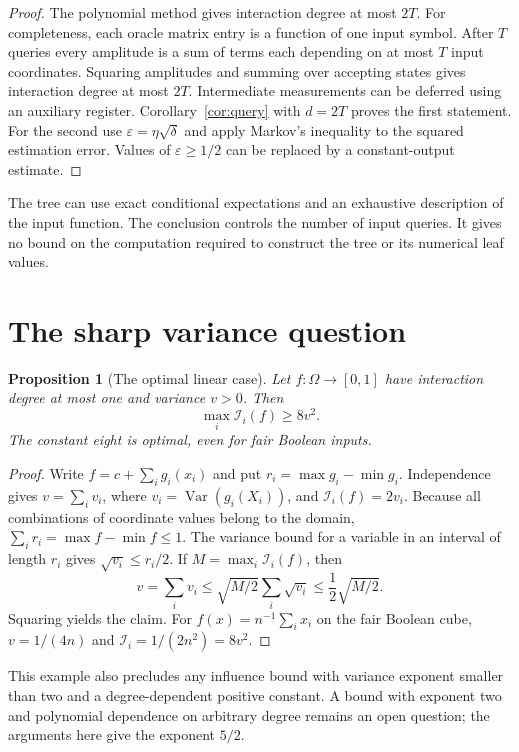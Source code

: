 \documentclass[11pt,reqno]{amsart}
\newtheorem{proposition}[theorem]{Proposition}
\theoremstyle{definition}
\theoremstyle{remark}
\newcommand{\Var}{\operatorname{Var}}
\newcommand{\cI}{\mathcal I}
\newcommand{\eps}{\varepsilon}
\numberwithin{equation}{section}
\begin{document}
\begin{proof}
The polynomial method \cite{BBCMW} gives interaction degree at most
$2T$. For completeness, each oracle matrix entry is a function of one
input symbol. After $T$ queries every amplitude is a sum of terms each
depending on at most $T$ input coordinates. Squaring amplitudes and
summing over accepting states gives interaction degree at most $2T$.
Intermediate measurements can be deferred using an auxiliary register.
Corollary~\ref{cor:query} with $d=2T$ proves the first statement.
For the second use $\eps=\eta\sqrt\delta$ and apply Markov's inequality
to the squared estimation error. Values of $\eps\ge1/2$ can be replaced
by a constant-output estimate.
\end{proof}

The tree can use exact conditional expectations and an exhaustive
description of the input function. The conclusion controls the number
of input queries. It gives no bound on the computation required to
construct the tree or its numerical leaf values.

\section{The sharp variance question}

\begin{proposition}[The optimal linear case]\label{prop:linear}
Let $f\colon\Omega\to[0,1]$ have interaction degree at most one and
variance $v>0$. Then
\[
 \max_i\cI_i(f)\ge8v^2.
\]
The constant eight is optimal, even for fair Boolean inputs.
\end{proposition}

\begin{proof}
Write $f=c+\sum_i g_i(x_i)$ and put
$r_i=\max g_i-\min g_i$. Independence gives
$v=\sum_i v_i$, where $v_i=\Var(g_i(X_i))$, and
$\cI_i(f)=2v_i$.
Because all combinations of coordinate values belong to the domain,
$\sum_i r_i=\max f-\min f\le1$.
The variance bound for a variable in an interval of length $r_i$ gives
$\sqrt{v_i}\le r_i/2$. If $M=\max_i\cI_i(f)$, then
\[
 v=\sum_i v_i\le\sqrt{M/2}\sum_i\sqrt{v_i}
 \le\frac12\sqrt{M/2}.
\]
Squaring yields the claim. For $f(x)=n^{-1}\sum_i x_i$ on the fair
Boolean cube, $v=1/(4n)$ and $\cI_i=1/(2n^2)=8v^2$.
\end{proof}

This example also precludes any influence bound with variance exponent
smaller than two and a degree-dependent positive constant. A bound with
exponent two and polynomial dependence on arbitrary degree remains an
open question; the arguments here give the exponent $5/2$.
\end{document}
